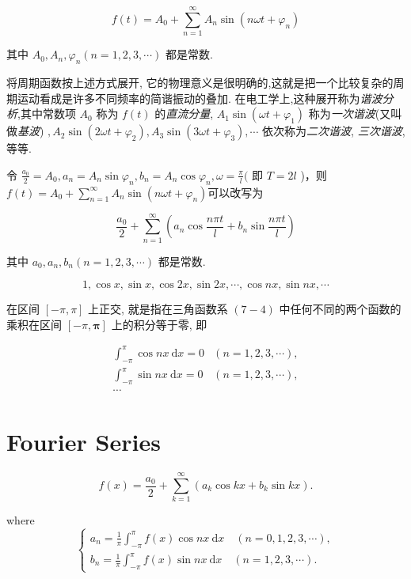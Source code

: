$$ f(t)=A_{0}+\sum_{n=1}^{\infty} A_{n} \sin \left(n \omega t+\varphi_{n}\right) $$

其中 $ A_{0}, A_{n}, \varphi_{n}(n=1,2,3, \cdots) $ 都是常数.

将周期函数按上述方式展开, 它的物理意义是很明确的,这就是把一个比较复杂的周期运动看成是许多不同频率的简谐振动的叠加. 在电工学上,这种展开称为\textit{谐波分析},其中常数项 $ A_{0} $ 称为 $ f(t) $ 的\textit{直流分量}, $ A_{1} \sin \left(\omega t+\varphi_{1}\right) $ 称为\textit{一次谐波}(又叫做\textit{基波}) $ , A_{2} \sin \left(2 \omega t+\varphi_{2}\right), A_{3} \sin \left(3 \omega t+\varphi_{3}\right), \cdots $ 依次称为\textit{二次谐波}, \textit{三次谐波},等等.

\begin{definition}[三角级数]
    令 $ \frac{a_{0}}{2}=A_{0}, a_{n}=A_{n} \sin \varphi_{n}, b_{n}=A_{n} \cos \varphi_{n}, \omega=\frac{\pi}{l}( $ 即 $ T=2 l $ )，则$ f(t)=A_{0}+\sum_{n=1}^{\infty} A_{n} \sin \left(n \omega t+\varphi_{n}\right) $可以改写为

    $$ \frac{a_{0}}{2}+\sum_{n=1}^{\infty}\left(a_{n} \cos \frac{n \pi t}{l}+b_{n} \sin \frac{n \pi t}{l}\right) $$

    其中 $ a_{0}, a_{n}, b_{n}(n=1,2,3, \cdots) $ 都是常数. 
\end{definition}

\begin{definition}[三角函数系]
    $$ 1, \cos x, \sin x, \cos 2 x, \sin 2 x, \cdots, \cos n x, \sin n x, \cdots $$

    在区间 $ [-\pi, \pi] $ 上正交, 就是指在三角函数系 $ (7-4) $ 中任何不同的两个函数的 乘积在区间 $ [-\pi, \boldsymbol{\pi}] $ 上的积分等于零, 即

    $$ \begin{array}{ll}\int_{-\pi}^{\pi} \cos n x \mathrm{~d} x=0 & (n=1,2,3, \cdots), \\ \int_{-\pi}^{\pi} \sin n x \mathrm{~d} x=0 & (n=1,2,3, \cdots),\\ \cdots
    \end{array} $$
\end{definition}

\section{Fourier Series}

\begin{definition}[傅里叶级数]
    $$
f(x)=\frac{a_{0}}{2}+\sum_{k=1}^{\infty}\left(a_{k} \cos k x+b_{k} \sin k x\right) .
$$

where $$ \left\{\begin{array}{l}a_{n}=\frac{1}{\pi} \int_{-\pi}^{\pi} f(x) \cos n x \mathrm{~d} x \quad(n=0,1,2,3, \cdots), \\ b_{n}=\frac{1}{\pi} \int_{-\pi}^{\pi} f(x) \sin n x \mathrm{~d} x \quad(n=1,2,3, \cdots) .\end{array}\right. $$
\end{definition}


